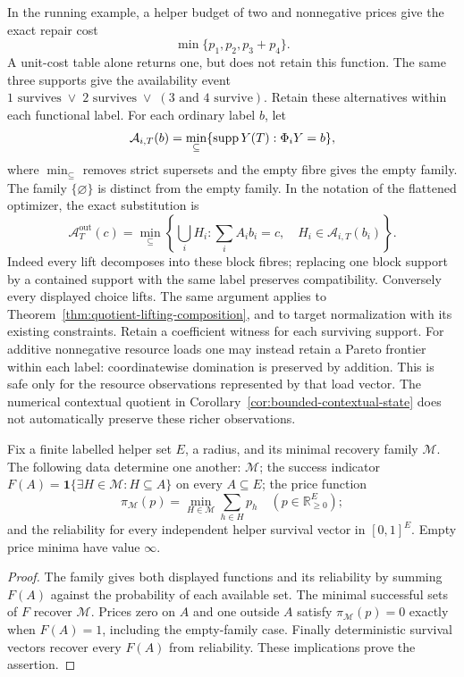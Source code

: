 In the running example, a helper budget of two and nonnegative prices give
the exact repair cost
\[
 \min\{p_1,p_2,p_3+p_4\}.
\]
A unit-cost table alone returns one, but does not retain this function.
The same three supports give the availability event
$1\text{ survives}\;\lor\;2\text{ survives}\;\lor\;
(3\text{ and }4\text{ survive})$.
Retain these alternatives within each functional label.  For each ordinary
label $b$, let
\[
 \mathcal A_{i,T}(b)=\min_{\subseteq}
 \{\operatorname{supp} Y(T):\Phi_iY=b\},
\]
where $\min_{\subseteq}$ removes strict supersets and the empty fibre gives
the empty family.  The family $\{\varnothing\}$ is distinct from the empty
family.  In the notation of the flattened optimizer, the exact substitution is
\begin{equation}
 \mathcal A_T^{\mathrm{out}}(c)=\min_{\subseteq}
 \left\{\bigcup_i H_i:\sum_iA_ib_i=c,\quad
                   H_i\in\mathcal A_{i,T}(b_i)\right\}.
 \label{eq:support-antichain-composition}
\end{equation}
Indeed every lift decomposes into these block fibres; replacing one block
support by a contained support with the same label preserves compatibility.
Conversely every displayed choice lifts.  The same argument applies to
Theorem~\ref{thm:quotient-lifting-composition}, and to target normalization
with its existing constraints.  Retain a coefficient witness for each
surviving support.  For additive nonnegative resource loads one may instead
retain a Pareto frontier within each label: coordinatewise domination is
preserved by addition.  This is safe only for the resource observations
represented by that load vector.  The numerical contextual quotient in
Corollary~\ref{cor:bounded-contextual-state} does not automatically preserve these richer observations.

\begin{proposition}
\label{prop:pricing-availability-equivalence}
%
Fix a finite labelled helper set $E$, a radius, and its minimal recovery
family $\mathcal M$.  The following data determine one another:
$\mathcal M$; the success indicator
$F(A)=\mathbf1\{\exists H\in\mathcal M:H\subseteq A\}$ on every
$A\subseteq E$; the price function
\[
 \pi_{\mathcal M}(p)=\min_{H\in\mathcal M}\sum_{h\in H}p_h
 \quad(p\in\mathbb R_{\geq0}^E);
\]
and the reliability for every independent helper survival vector in
$[0,1]^E$.  Empty price minima have value $\infty$.
\end{proposition}

\begin{proof}
The family gives both displayed functions and its reliability by summing
$F(A)$ against the probability of each available set.  The minimal successful
sets of $F$ recover $\mathcal M$.  Prices zero on $A$ and one outside $A$
satisfy $\pi_{\mathcal M}(p)=0$ exactly when $F(A)=1$, including the
empty-family case.  Finally deterministic survival vectors recover every
$F(A)$ from reliability.  These implications prove the assertion.
%
\end{proof}


